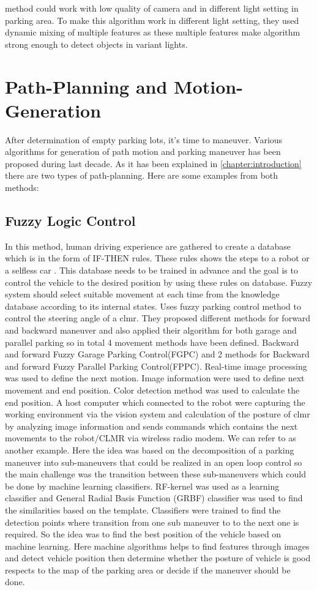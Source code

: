 method could work with low quality of camera and in different light setting in parking area. To make this algorithm work in different light setting, they used dynamic mixing of multiple features as these multiple features make algorithm strong enough to detect objects in variant lights. 

\section{Path-Planning and Motion-Generation}
After determination of empty parking lots, it's time to maneuver. Various algorithms for generation of path motion and parking maneuver has been proposed during last decade. As it has been explained in \ref{chapter:introduction} there are two types of path-planning. Here are some examples from both methods:
\subsection{Fuzzy Logic Control}
In this method, human driving experience are gathered to create a database which is in the form of IF-THEN rules. These rules shows the steps to a robot or a selfless car \cite{novel-CLMR}. This database needs to be trained in advance and the goal is to control the vehicle  to the desired position by using these rules on database. Fuzzy system should select suitable movement at each time from the knowledge database according to its internal states. \cite{fuzzy} Uses fuzzy parking control method to control the steering angle of a \acrfull{clmr}. They proposed different methods for forward and backward maneuver and also applied their algorithm for both garage and parallel parking so in total 4 movement methods have been defined. Backward and forward Fuzzy Garage Parking Control(FGPC) and 2 methods for Backward and forward Fuzzy Parallel Parking Control(FPPC). Real-time image processing was used to define the next motion. Image information were used to define next movement and end position. Color detection method was used to calculate the end position. A host computer which connected to the robot were capturing the working environment via the vision system and calculation of the posture of \acrshort{clmr} by analyzing image information and sends commands which contains the next movements to the robot/CLMR via wireless radio modem. We can refer to \cite{machine-learning-parking} as another example. Here the idea was based on the decomposition of a parking maneuver into sub-maneuvers that could be realized in an open loop control so the main challenge was the transition between these sub-maneuvers which could be done by machine learning classifiers. RF-kernel was used as a learning classifier and General Radial Basis Function (GRBF) classifier was used to find the similarities based on the template. Classifiers were trained to find the detection points where transition from one sub maneuver to to the next one is required. So the idea was to find the best position of the vehicle based on machine learning. Here machine algorithms helps to find features through images and detect vehicle position then determine whether the posture of vehicle is good respects to the map of the parking area or decide if the maneuver should be done.
